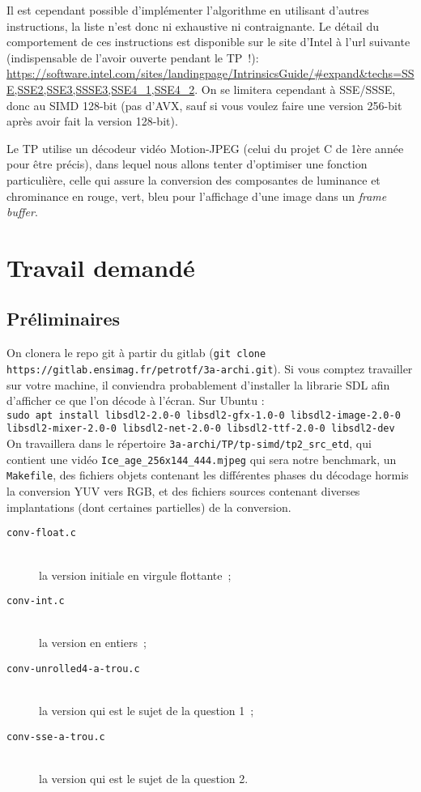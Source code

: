 \documentclass[a4paper,12pt]{article}
\begin{document}
\vspace{10pt}
Il est cependant possible d'implémenter l'algorithme en utilisant d'autres instructions, la liste n'est donc ni exhaustive ni contraignante. Le détail du comportement de ces instructions est disponible sur le site d'Intel à l'url suivante (indispensable de l'avoir ouverte pendant le TP~!):\\
{\footnotesize\ttfamily \url{https://software.intel.com/sites/landingpage/IntrinsicsGuide/#expand&techs=SSE,SSE2,SSE3,SSSE3,SSE4_1,SSE4_2}}. On se limitera cependant à SSE/SSSE, donc au SIMD 128-bit (pas d'AVX, sauf si vous voulez faire une version 256-bit après avoir fait la version 128-bit).

Le TP utilise un décodeur vidéo Motion-JPEG (celui du projet C de 1ère année pour être précis), dans lequel nous allons tenter d'optimiser une fonction particulière, celle qui assure la conversion des composantes de luminance et chrominance en rouge, vert, bleu pour l'affichage d'une image dans un \emph{frame buffer}.

\section{Travail demandé}

\subsection{Préliminaires}

On clonera le repo git à partir du gitlab (\lstinline{git clone  https://gitlab.ensimag.fr/petrotf/3a-archi.git}). Si vous comptez travailler sur votre machine, il conviendra probablement d'installer la librarie SDL afin d'afficher ce que l'on décode à l'écran. Sur Ubuntu : \\

\lstinline{sudo apt install libsdl2-2.0-0 libsdl2-gfx-1.0-0 libsdl2-image-2.0-0 libsdl2-mixer-2.0-0 libsdl2-net-2.0-0 libsdl2-ttf-2.0-0 libsdl2-dev} \\

On travaillera dans le répertoire \lstinline{3a-archi/TP/tp-simd/tp2_src_etd}, qui contient une vidéo \lstinline{Ice_age_256x144_444.mjpeg} qui sera notre benchmark, un \lstinline{Makefile}, des fichiers objets contenant les différentes phases du décodage hormis la conversion YUV vers RGB, et des fichiers sources contenant diverses implantations (dont certaines partielles) de la conversion.
\begin{description}
\item[\texttt{conv-float.c}]~\\
     la version initiale en virgule flottante~;
\item[\texttt{conv-int.c}]~\\
     la version en entiers~;
\item[\texttt{conv-unrolled4-a-trou.c}]~\\
     la version qui est le sujet de la question 1~;
\item[\texttt{conv-sse-a-trou.c}]~\\
     la version qui est le sujet de la question 2.
\end{description}
\end{document}
